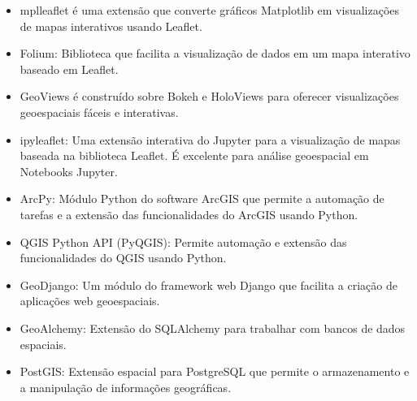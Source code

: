 \documentclass[letterpaper,10pt,english]{jupyterBook}
\begin{document}
\sphinxAtStartPar
{}
\begin{itemize}
\item {} 
\sphinxAtStartPar
mplleaflet é uma extensão que converte gráficos Matplotlib em visualizações de mapas interativos usando Leaflet.

\item {} 
\sphinxAtStartPar
Folium: Biblioteca que facilita a visualização de dados em um mapa interativo baseado em Leaflet.

\item {} 
\sphinxAtStartPar
GeoViews é construído sobre Bokeh e HoloViews para oferecer visualizações geoespaciais fáceis e interativas.

\item {} 
\sphinxAtStartPar
ipyleaflet: Uma extensão interativa do Jupyter para a visualização de mapas baseada na biblioteca Leaflet. É excelente para análise geoespacial em Notebooks Jupyter.

\end{itemize}

\sphinxAtStartPar
{}
\begin{itemize}
\item {} 
\sphinxAtStartPar
ArcPy: Módulo Python do software ArcGIS que permite a automação de tarefas e a extensão das funcionalidades do ArcGIS usando Python.

\item {} 
\sphinxAtStartPar
QGIS Python API (PyQGIS): Permite automação e extensão das funcionalidades do QGIS usando Python.

\end{itemize}

\sphinxAtStartPar
{}
\begin{itemize}
\item {} 
\sphinxAtStartPar
GeoDjango: Um módulo do framework web Django que facilita a criação de aplicações web geoespaciais.

\item {} 
\sphinxAtStartPar
GeoAlchemy: Extensão do SQLAlchemy para trabalhar com bancos de dados espaciais.

\item {} 
\sphinxAtStartPar
PostGIS: Extensão espacial para PostgreSQL que permite o armazenamento e a manipulação de informações geográficas.

\end{itemize}
\end{document}
